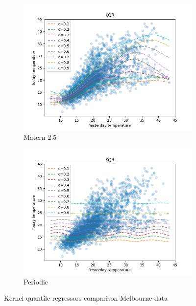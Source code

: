 \begin{figure}[!h]
    \begin{subfigure}[b]{0.5\linewidth}
        \centering
        \includegraphics[width=1.1\textwidth]{images/melborune_matern_2.5_kernel_quantile_regression.png}
        \caption{Matern 2.5} 
        \label{} 
    \end{subfigure} 
    \begin{subfigure}[b]{0.5\linewidth}
        \centering
        \includegraphics[width=1.1\textwidth]{images/melborune_periodic_kernel_quantile_regression.png}
        \caption{Periodic} 
        \label{} 
    \end{subfigure} 
    \caption{Kernel quantile regressors comparison Melbourne data}
    \label{fig:kernel quantile regressors comparison} 
\end{figure}

